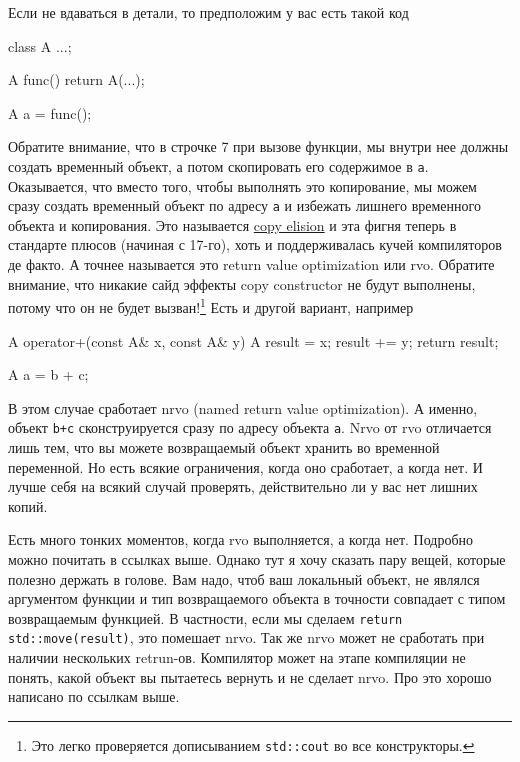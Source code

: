 \documentclass{article}
\begin{document}
Если не вдаваться в детали, то предположим у вас есть такой код
\begin{cppcode}
class A {...};

A func() {
  return A(...);
}

A a = func();
\end{cppcode}
Обратите внимание, что в строчке 7 при вызове функции, мы внутри нее должны создать временный объект, а потом скопировать его содержимое в \verb"a". Оказывается, что вместо того, чтобы выполнять это копирование, мы можем сразу создать временный объект по адресу \verb"a" и избежать лишнего временного объекта и копирования. Это называется \href{https://en.cppreference.com/w/cpp/language/copy_elision}{copy elision} и эта фигня теперь в стандарте плюсов (начиная с 17-го), хоть и поддерживалась кучей компиляторов де факто. А точнее называется это return value optimization или rvo. Обратите внимание, что никакие сайд эффекты copy constructor не будут выполнены, потому что он не будет вызван!\footnote{Это легко проверяется дописыванием \verb"std::cout" во все конструкторы.} Есть и другой вариант, например
\begin{cppcode}
A operator+(const A& x, const A& y) {
  A result = x;
  result += y;
  return result;
}

A a = b + c;
\end{cppcode}
В этом случае сработает nrvo (named return value optimization). А именно, объект \verb"b+c" сконструируется сразу по адресу объекта \verb"a". Nrvo от rvo отличается лишь тем, что вы можете возвращаемый объект хранить во временной переменной. Но есть всякие ограничения, когда оно сработает, а когда нет. И лучше себя на всякий случай проверять, действительно ли у вас нет лишних копий.

Есть много тонких моментов, когда rvo выполняется, а когда нет. Подробно можно почитать в ссылках выше. Однако тут я хочу сказать пару вещей, которые полезно держать в голове. Вам надо, чтоб ваш локальный объект, не являлся аргументом функции и тип возвращаемого объекта в точности совпадает с типом возвращаемым функцией. В частности, если мы сделаем \verb"return std::move(result)", это помешает nrvo. Так же nrvo может не сработать при наличии нескольких retrun-ов. Компилятор может на этапе компиляции не понять, какой объект вы пытаетесь вернуть и не сделает nrvo. Про это хорошо написано по ссылкам выше.

\end{document}
